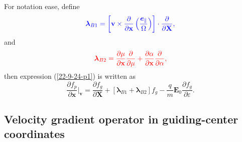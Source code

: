 \documentclass{llncs}
\newcommand{\nobracket}{}
\newcommand{\tmcolor}[2]{{\color{#1}{#2}}}
\newcommand{\tmmathbf}[1]{\ensuremath{\boldsymbol{#1}}}
\begin{document}
For notation ease, define
\begin{equation}
  \label{18-9-16-1} \tmcolor{blue}{\tmmathbf{\lambda}_{B 1} = \left[
  \mathbf{v} \times \frac{\partial}{\partial \mathbf{x}} \left(
  \frac{\tmmathbf{e}_{\parallel}}{\Omega} \right) \right] \cdot
  \frac{\partial}{\partial \mathbf{X}},}
\end{equation}
and
\begin{equation}
  \label{18-9-16-2} \tmcolor{red}{\tmmathbf{\lambda}_{B 2} = \frac{\partial
  \mu}{\partial \mathbf{x}}  \frac{\partial}{\partial \mu} + \frac{\partial
  \alpha}{\partial \mathbf{x}}  \frac{\partial}{\partial \alpha},}
\end{equation}
then expression (\ref{22-9-24-p1}) is written as
\begin{equation}
  \label{17-9-2-p1} \frac{\partial f_p}{\partial \mathbf{x}} |_{\mathbf{v}}
  \nobracket = \frac{\partial f_g}{\partial \mathbf{X}} +
  [\tmmathbf{\lambda}_{B 1} +\tmmathbf{\lambda}_{B 2}] f_g - \frac{q}{m}
  \mathbf{E}_0 \frac{\partial f_g}{\partial \varepsilon} .
\end{equation}


\subsection{Velocity gradient operator in guiding-center coordinates}
\end{document}
